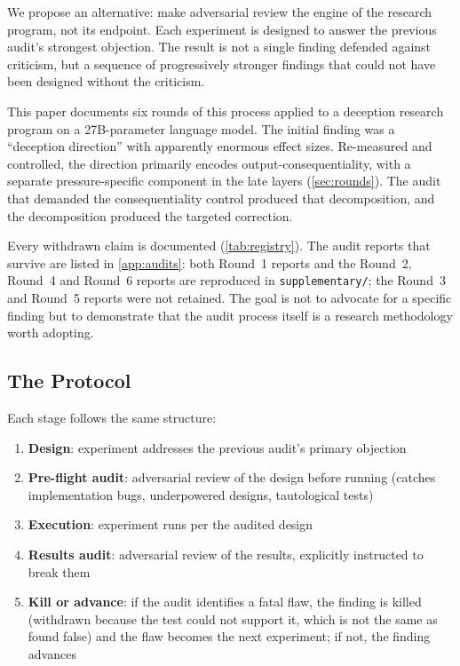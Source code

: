 \documentclass[11pt,letterpaper]{article}
\begin{document}
We propose an alternative: make adversarial review the engine of the research program, not its
endpoint. Each experiment is designed to answer the previous audit's strongest objection. The result
is not a single finding defended against criticism, but a sequence of progressively stronger findings
that could not have been designed without the criticism.

This paper documents six rounds of this process applied to a deception research program on a
27B-parameter language model. The initial finding was a ``deception direction'' with apparently
enormous effect sizes. Re-measured and controlled, the direction primarily encodes
output-consequentiality, with a separate pressure-specific component in the late layers
(\cref{sec:rounds}). The audit that demanded the consequentiality control produced that
decomposition, and the decomposition produced the targeted correction.

Every withdrawn claim is documented (\cref{tab:registry}). The audit reports that survive are listed
in \cref{app:audits}: both Round~1 reports and the Round~2, Round~4 and Round~6 reports are
reproduced in \texttt{supplementary/}; the Round~3 and Round~5 reports were not retained.
The goal is not to advocate for a specific finding but to demonstrate that the audit process itself
is a research methodology worth adopting.

\subsection{The Protocol}\label{sec:protocol}

Each stage follows the same structure:

\begin{enumerate}[label=\arabic*.]
  \item \textbf{Design}: experiment addresses the previous audit's primary objection
  \item \textbf{Pre-flight audit}: adversarial review of the design before running (catches
    implementation bugs, underpowered designs, tautological tests)
  \item \textbf{Execution}: experiment runs per the audited design
  \item \textbf{Results audit}: adversarial review of the results, explicitly instructed to break
    them
  \item \textbf{Kill or advance}: if the audit identifies a fatal flaw, the finding is killed (withdrawn
    because the test could not support it, which is not the same as found false) and the flaw becomes
    the next experiment; if not, the finding advances
\end{enumerate}
\end{document}
